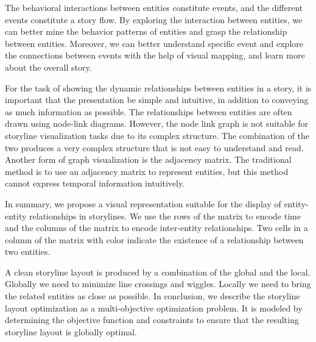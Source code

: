 \documentclass[review,journal]{vgtc}         %
\begin{document}
The behavioral interactions between entities constitute events, and the different events constitute a story flow. 
By exploring the interaction between entities, we can better mine the behavior patterns of entities and grasp the relationship between entities. Moreover, we can better understand specific event and explore the connections between events with the help of visual mapping, and learn more about the overall story.


For the task of showing the dynamic relationships between entities in a story, it is important that the presentation be simple and intuitive, in addition to conveying as much information as possible.
The relationships between entities are often drawn using node-link diagrams. However, the node link graph is not suitable for storyline visualization tasks due to its complex structure. The combination of the two produces a very complex structure that is not easy to understand and read. Another form of graph visualization is the adjacency matrix. The traditional method is to use an adjacency matrix to represent entities, but this method cannot express temporal information intuitively.

In summary, we propose a visual representation suitable for the display of entity-entity relationships in storylines. We use the rows of the matrix to encode time and the columns of the matrix to encode inter-entity relationships. Two cells in a column of the matrix with color indicate the existence of a relationship between two entities.


A clean storyline layout is produced by a combination of the global and the local. Globally we need to minimize line crossings and wiggles. Locally we need to bring the related entities as close as possible. In conclusion, we describe the storyline layout optimization as a multi-objective optimization problem. It is modeled by determining the objective function and constraints to ensure that the resulting storyline layout is globally optimal.
\end{document}
